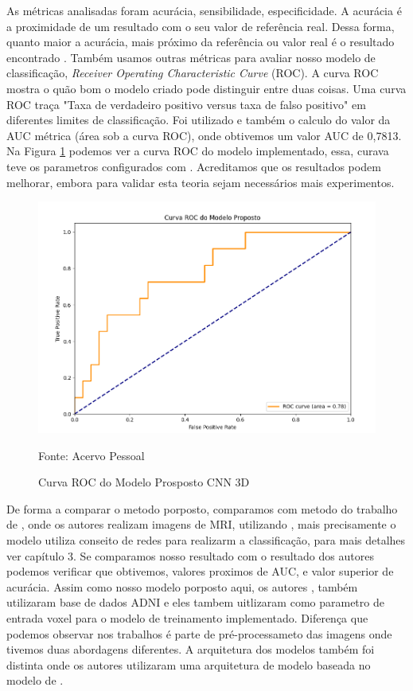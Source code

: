 \documentclass[openright]{UFRGS} %
\begin{document}
As métricas analisadas foram  acurácia, sensibilidade, especificidade. A acurácia é a proximidade de um resultado com o seu valor de referência real. Dessa forma, quanto maior a acurácia, mais próximo da referência ou valor real é o resultado encontrado \cite{monico2009acuracia}
. Também usamos outras métricas para avaliar nosso modelo de classificação, \textit{Receiver Operating Characteristic Curve} (ROC).
A curva ROC mostra o quão bom o modelo criado pode distinguir entre duas coisas.
Uma curva ROC traça "Taxa de verdadeiro positivo versus taxa de falso positivo"  em diferentes limites de classificação.
Foi utilizado e também o calculo do valor da AUC métrica (área sob a curva ROC), onde obtivemos um valor AUC de 0,7813. Na Figura  \ref{fig:rocCurve} podemos ver a curva ROC do modelo implementado, essa, curava teve os parametros configurados com .
Acreditamos que os resultados podem melhorar,
embora para validar esta teoria sejam necessários mais experimentos.



\begin{figure}[h]
    \centering
    \caption{Curva ROC do Modelo Prosposto CNN 3D}
    \includegraphics[scale=0.40]{ROCCurvemodelopro.png}
    \centerline{Fonte: Acervo Pessoal}
    \label{fig:rocCurve}
\end{figure}


De forma a comparar o metodo porposto, comparamos com metodo do trabalho de \cite{rieke2018visualizing}, onde os autores realizam  imagens de MRI, utilizando  , mais precisamente o modelo  utiliza conseito de redes  para realizarm a classificação, para mais detalhes ver capítulo 3. Se comparamos nosso resultado com o resultado dos autores podemos verificar que obtivemos, valores proximos de AUC, e valor superior de acurácia. Assim como nosso modelo porposto aqui, os autores \cite{rieke2018visualizing}, também utilizaram base de dados ADNI e eles tambem uitlizaram como parametro de entrada voxel para o modelo de treinamento implementado. Diferença que podemos observar nos trabalhos é parte de pré-processameto das imagens onde tivemos duas abordagens diferentes. A arquitetura dos modelos também foi distinta onde \cite{rieke2018visualizing}  os autores utilizaram uma arquitetura de modelo baseada no modelo de \cite{khvostikov20183d}.
\end{document}

